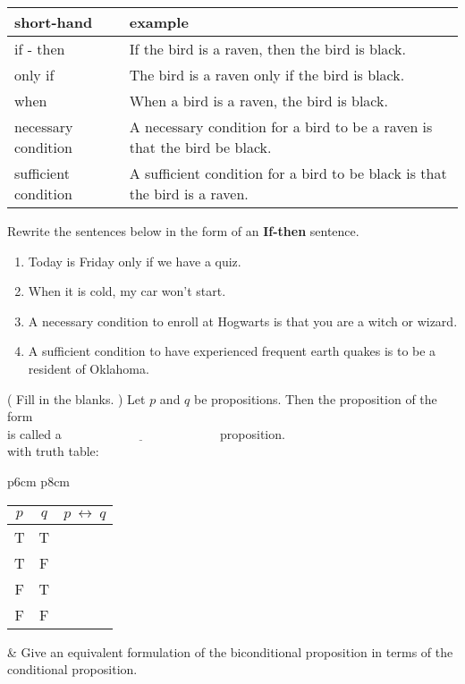 \documentclass[12pt]{article}
\newcommand{\be}{\begin{enumerate}}
\newcommand{\ee}{\end{enumerate}}
\newcommand{\llra}{\longleftrightarrow}
\begin{document}
\begin{tabular}{l|l}
short-hand & example\\
\hline
\hline
if - then & If the bird is a raven, then the bird is black.\\
\hline
only if & The bird is a raven only if the bird is black.\\
\hline
when & When a bird is a raven, the bird is black.\\
\hline
necessary condition&A necessary condition for a bird to be a raven is that the bird be black.\\
\hline
sufficient condition& A sufficient condition for a bird to be black is that the bird is a raven.\\
\hline
\end{tabular}

Rewrite the sentences below in the form of an \textbf{If-then} sentence. 
\be
\item Today is Friday only if we have a quiz.
\newpage
\item When it is cold, my car won't start.
\vfill
\item A necessary condition to enroll at Hogwarts is that you are a witch or wizard.
\vfill
\item A sufficient condition to have experienced frequent earth quakes is to be a resident of Oklahoma.
\vfill
\ee

\item ( Fill in the blanks. ) Let $p$ and $q$ be propositions. Then the proposition of the form \\

\vspace{.1in}
\fbox{$p~\llra~q$} is called a $\underline{\hspace{2in}}$ proposition. \\

with truth table:\\

\begin{tabular}{p{6cm} p{8cm}}
{\Large {
\begin{tabular}[t]{c|c||c}
$p$ & $q$ & $p~\llra~q$ \\
\hline \hline
T&T&\\
\hline
T&F&\\
\hline
F&T&\\
\hline
F&F&\\
\end{tabular}}}
&
Give an equivalent formulation of the biconditional proposition in terms of the conditional proposition.\\
\end{tabular}
\end{document}
